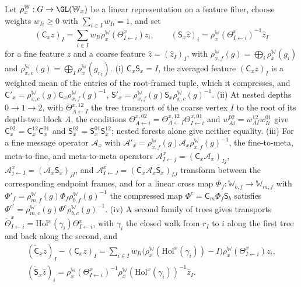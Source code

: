 Let $\rho^{\mathbb W}_x:G\to\GL(\mathbb W_x)$ be a linear representation on a feature fiber, choose weights $w_{Ii}\geq0$ with
$\sum_{i\in I}w_{Ii}=1$, and set
\begin{equation}
(\mathsf C_xz)_I=\sum_{i\in I}w_{Ii}\rho^{\mathbb W}_x(\Theta^x_{I\leftarrow i})z_i,
\qquad
(\mathsf S_x\hat z)_i=\rho^{\mathbb W}_x(\Theta^x_{I\leftarrow i})^{-1}\hat z_I
\label{eq:rg-linear-cross-scale-maps}
\end{equation}
for a fine feature $z$ and a coarse feature $\hat z=(\hat z_I)_I$, with
$\rho^{\mathbb W}_{x,f}(g)=\bigoplus_i\rho^{\mathbb W}_x(g_i)$ and $\rho^{\mathbb W}_{x,c}(g)=\bigoplus_I\rho^{\mathbb W}_x(g_{r_I})$. (i)
$\mathsf C_x\mathsf S_x=I$, the averaged feature $(\mathsf C_xz)_I$ is a weighted mean of the entries of the
root-framed tuple, which it compresses, and
$\mathsf C'_x=\rho^{\mathbb W}_{x,c}(g)\mathsf C_x\rho^{\mathbb W}_{x,f}(g)^{-1}$,
$\mathsf S'_x=\rho^{\mathbb W}_{x,f}(g)\mathsf S_x\rho^{\mathbb W}_{x,c}(g)^{-1}$. (ii) At nested depths $0\to1\to2$, with
$\Theta^{x,12}_{A\leftarrow I}$ the tree transport of the coarse vertex $I$ to the root of its depth-two
block $A$, the conditions
$\Theta^{x,02}_{A\leftarrow i}=\Theta^{x,12}_{A\leftarrow I}\Theta^{x,01}_{I\leftarrow i}$ and
$w^{02}_{Ai}=w^{12}_{AI}w^{01}_{Ii}$ give $\mathsf C^{02}_x=\mathsf C^{12}_x\mathsf C^{01}_x$ and
$\mathsf S^{02}_x=\mathsf S^{01}_x\mathsf S^{12}_x$; nested forests alone give neither equality. (iii) For a
fine message operator $\mathcal A_x$ with $\mathcal A'_x=\rho^{\mathbb W}_{x,f}(g)\mathcal A_x\rho^{\mathbb W}_{x,f}(g)^{-1}$, the
fine-to-meta, meta-to-fine, and meta-to-meta operators
$\mathcal A^x_{I\leftarrow j}=(\mathsf C_x\mathcal A_x)_{Ij}$,
$\mathcal A^x_{j\leftarrow I}=(\mathcal A_x\mathsf S_x)_{jI}$, and
$\mathcal A^x_{I\leftarrow J}=(\mathsf C_x\mathcal A_x\mathsf S_x)_{IJ}$ transform between the corresponding
endpoint frames, and for a linear cross map $\Phi_f:\mathbb W_{b,f}\to \mathbb W_{m,f}$ with
$\Phi'_f=\rho^{\mathbb W}_{m,f}(g)\Phi_f\rho^{\mathbb W}_{b,f}(g)^{-1}$ the compressed map $\Phi^c=\mathsf C_m\Phi_f\mathsf S_b$
satisfies $\Phi^{c\prime}=\rho^{\mathbb W}_{m,c}(g)\Phi^c\rho^{\mathbb W}_{b,c}(g)^{-1}$. (iv) A second family of trees gives
transports $\widetilde\Theta^x_{I\leftarrow i}=\mathrm{Hol}^x(\gamma_i)\Theta^x_{I\leftarrow i}$, with
$\gamma_i$ the closed walk from $r_I$ to $i$ along the first tree and back along the second, and
\begin{equation}
\begin{gathered}
(\widetilde{\mathsf C}_xz)_I-(\mathsf C_xz)_I
=\sum_{i\in I}w_{Ii}\bigl(\rho^{\mathbb W}_x(\mathrm{Hol}^x(\gamma_i))-I\bigr)\rho^{\mathbb W}_x(\Theta^x_{I\leftarrow i})z_i,\\
(\widetilde{\mathsf S}_x\hat z)_i=\rho^{\mathbb W}_x(\Theta^x_{I\leftarrow i})^{-1}\rho^{\mathbb W}_x(\mathrm{Hol}^x(\gamma_i))^{-1}\hat z_I.
\end{gathered}
\label{eq:rg-linear-cross-scale-tree-change}
\end{equation}
